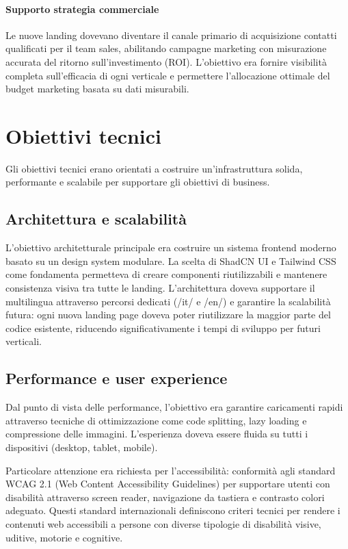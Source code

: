 \paragraph{Supporto strategia commerciale}
Le nuove landing dovevano diventare il canale primario di acquisizione 
contatti qualificati per il team sales, abilitando campagne marketing con 
misurazione accurata del ritorno sull'investimento (ROI). L'obiettivo era 
fornire visibilità completa sull'efficacia di ogni verticale e permettere 
l'allocazione ottimale del budget marketing basata su dati misurabili.

\section{Obiettivi tecnici}
Gli obiettivi tecnici erano orientati a costruire un'infrastruttura 
solida, performante e scalabile per supportare gli obiettivi di business.

\subsection{Architettura e scalabilità}
L'obiettivo architetturale principale era costruire un sistema frontend 
moderno basato su un design system modulare. La scelta di ShadCN UI e 
Tailwind CSS come fondamenta permetteva di creare componenti riutilizzabili 
e mantenere consistenza visiva tra tutte le landing. L'architettura doveva 
supportare il multilingua attraverso percorsi dedicati (/it/ e /en/) e 
garantire la scalabilità futura: ogni nuova landing page doveva poter 
riutilizzare la maggior parte del codice esistente, riducendo 
significativamente i tempi di sviluppo per futuri verticali.

\subsection{Performance e user experience}
Dal punto di vista delle performance, l'obiettivo era garantire 
caricamenti rapidi attraverso tecniche di ottimizzazione come code 
splitting, lazy loading e compressione delle immagini. L'esperienza 
doveva essere fluida su tutti i dispositivi (desktop, tablet, mobile). 

Particolare attenzione era richiesta per l'accessibilità: conformità 
agli standard WCAG 2.1 (Web Content Accessibility Guidelines)
per supportare utenti con disabilità attraverso screen reader, navigazione 
da tastiera e contrasto colori adeguato. Questi standard internazionali 
definiscono criteri tecnici per rendere i contenuti web accessibili a 
persone con diverse tipologie di disabilità visive, uditive, motorie e 
cognitive.

